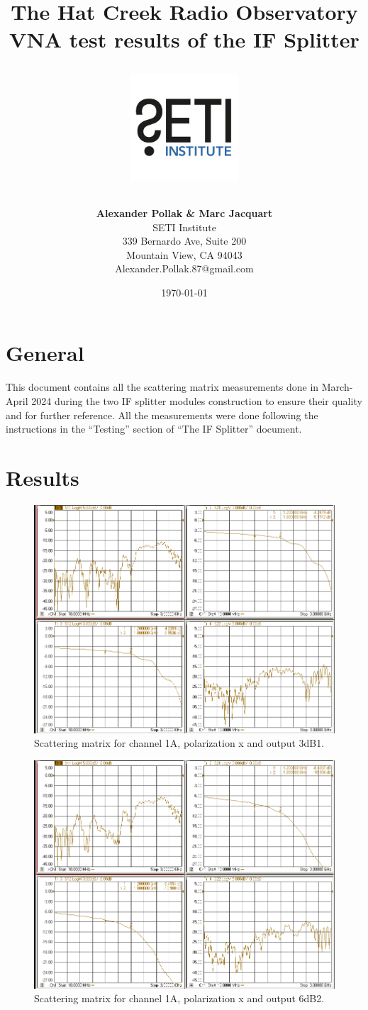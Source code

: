 \documentclass[12pt,a4paper,oneside]{article}
\title{\Huge The Hat Creek Radio Observatory\\
\vspace{0.5cm}
VNA test results of the IF Splitter\\
\vspace{0.5cm}
\normalsize \emph{}
\vspace{3.5cm}
\begin{center}
\includegraphics[height=4cm]{titlepage/SETI_institute_logo.jpg}
\end{center}
}
\author{ 
\vspace{1cm}
\Large
\textbf{ Alexander Pollak \& Marc Jacquart} \\
SETI Institute \\ 
339 Bernardo Ave, Suite 200 \\
Mountain View, CA 94043 \\ 
Alexander.Pollak.87@gmail.com\\
}
\date{\today}
\begin{document}
\clearpage\maketitle
\thispagestyle{empty}
\newpage
\section{General}
This document contains all the scattering matrix measurements done in March-April 2024 during the two IF splitter modules construction to ensure their quality and for further reference. All the measurements were done following the instructions in the ``Testing'' section of ``The IF Splitter'' document.
\vspace{7cm}
\section{Results}

\begin{figure}[H]
\centering
\includegraphics[width=0.9\linewidth]{VNA_results/1Ax_3dB1.png}
\caption{Scattering matrix for channel 1A, polarization x and output 3dB1.}
\label{fig:1Ax_3dB1}
\end{figure}


\begin{figure}[H]
\centering
\includegraphics[width=0.9\linewidth]{VNA_results/1Ax_6dB2.png}
\caption{Scattering matrix for channel 1A, polarization x and output 6dB2.}
\label{fig:1Ax_6dB2}
\end{figure}
\end{document}
